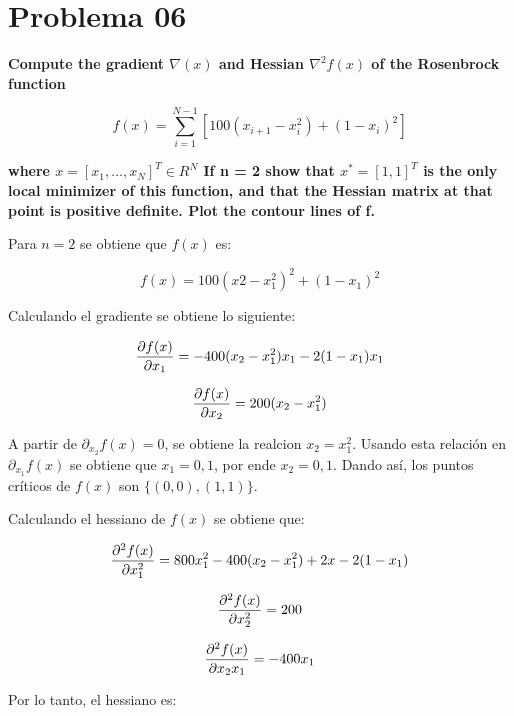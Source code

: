 \section*{Problema 06}

\textbf{Compute the gradient $\nabla (x)$ and Hessian $\nabla^2 f (x)$ of the Rosenbrock function}

\begin{equation*}
    f(x) = \sum_{i=1}^{N-1}[100(x_{i+1}-x_i^2)+(1-x_i)^2]
\end{equation*}

\textbf{where $x = [x_1 ,\dots, x_N ]^T \in R^N$ If n = 2 show that $x^*  = [1, 1]^T$ is the only local minimizer of this function, and that the Hessian matrix at that point is positive definite. Plot the contour lines of f.}

Para $n=2$ se obtiene que $f(x)$ es:

\begin{equation*}
    f(x) = 100(x2-x_1^2)^2 +(1-x_1)^2
\end{equation*}

Calculando el gradiente se obtiene lo siguiente:

\begin{equation*}
    \frac{\partial f(x)}{\partial x_1} = -400(x_2-x_1^2)x_1 -2(1-x_1)x_1
\end{equation*}

\begin{equation*}
    \frac{\partial f(x)}{\partial x_2} = 200(x_2-x_1^2)
\end{equation*}

A partir de $\partial_{x_2} f(x)=0$, se obtiene la realcion $x_2=x_1^2$. Usando esta relación en $\partial_{x_1}f(x)$ se obtiene que $x_1=0,1$, por ende $x_2=0,1$. Dando así, los puntos críticos de $f(x)$ son $\{(0,0),(1,1)\}$.

Calculando el hessiano de $f(x)$ se obtiene que:

\begin{equation*}
    \frac{\partial ^2f(x)}{\partial x_1^2} = 800x_1^2 -400(x_2-x_1^2)+2x-2(1-x_1)
\end{equation*}

\begin{equation*}
    \frac{\partial ^2f(x)}{\partial x_2^2} = 200
\end{equation*}

\begin{equation*}
    \frac{\partial ^2f(x)}{\partial x_2x_1} = -400x_1
\end{equation*}

Por lo tanto, el hessiano es:

